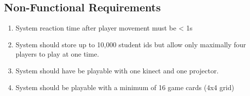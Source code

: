\subsection{Non-Functional Requirements}

\begin{enumerate}
	\item System reaction time after player movement must be < 1s
	\item System should store up to 10,000 student ids but allow only maximally four players to play at one time.
	\item System should have be playable with one kinect and one projector.
	\item System should be playable with a minimum of 16 game cards (4x4 grid)
\end{enumerate}